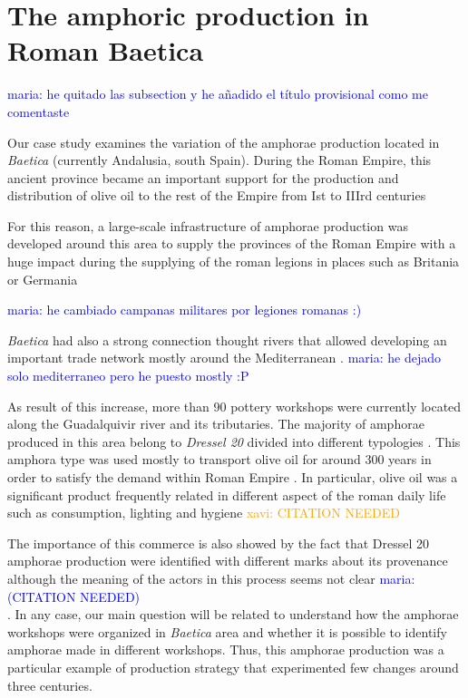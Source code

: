 \documentclass[review]{elsarticle}
\newcommand{\memo}[2]{\textcolor{#1}{#2}}
\newcommand{\xavi}[1]{\memo{orange}{xavi: #1\\}}
\newcommand{\maria}[1]{\memo{blue}{maria: #1\\}}
\begin{document}
\section{The amphoric production in Roman Baetica}

\maria{he quitado las subsection y he añadido el t\'itulo provisional como me comentaste}

Our case study examines the variation of the amphorae production located in \emph{Baetica} (currently Andalusia, south Spain). During the Roman Empire, this ancient province became an important support for the production and distribution of olive oil to the rest of the Empire from Ist to IIIrd centuries \cite{chic_comercio_2005,millet_anforas_1998, rodriguez_baetican_1998} 



For this reason, a large-scale infrastructure of amphorae production was developed around this area to supply the provinces of the Roman Empire with a huge impact during the supplying of the roman legions in places such as Britania \citep{funari_economic_2005, monfort_britannia_1998} or Germania %

\maria{he cambiado campanas militares por legiones romanas :)}

\emph{Baetica} had also a strong connection thought rivers that allowed developing an important trade network mostly around the Mediterranean \citep{garcia_vargas_enrique_formal_2010}. 
\maria{ he dejado solo mediterraneo pero he puesto mostly :P}

As result of this increase, more than 90 pottery workshops were currently located along the Guadalquivir river and its tributaries. The majority of amphorae produced in this area belong to \emph{Dressel 20} divided into different typologies \citep{berni_millet_epigrafianforica_2008, martin-kilcher_romischen_1994}. This amphora type was used mostly to transport olive oil for around 300 years in order to satisfy the demand within Roman Empire \citep{rodriguez_economioleicola_1977}. In particular, olive oil was a significant product frequently related in different aspect of the roman daily life such as consumption, lighting and hygiene %
\xavi{CITATION NEEDED}

The importance of this commerce is also showed by the fact that Dressel 20 amphorae production were identified with different marks about its provenance although the meaning of the actors in this process seems not clear \maria{(CITATION NEEDED)}. In any case, our main question will be related to understand how the amphorae workshops were organized in \textit{Baetica} area and whether it is possible to identify amphorae made in different workshops. 
Thus, this amphorae production was a particular example of production strategy that experimented few changes around three centuries.   
\end{document}
